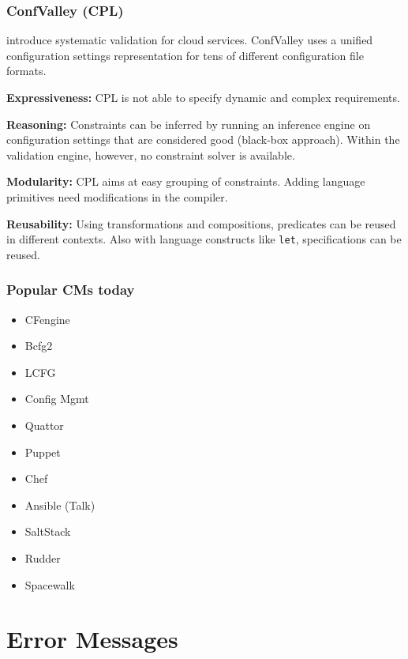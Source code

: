 \begin{frame}
	\frametitle{ConfValley (CPL)}

	\citet{huang2015confvalley} introduce systematic validation for cloud services.
	ConfValley uses a unified configuration settings representation for tens of different configuration file formats.

	\textbf{Expressiveness:}
	CPL is not able to specify dynamic and complex requirements.

	\textbf{Reasoning:}
	Constraints can be inferred by running an inference engine on configuration settings that are considered good (black-box approach).
	Within the validation engine, however, no constraint solver is available.

	\textbf{Modularity:}
	CPL aims at easy grouping of constraints.
	Adding language primitives need modifications in the compiler.

	\textbf{Reusability:}
	Using transformations and compositions, predicates can be reused in different contexts.
	Also with language constructs like \texttt{let}, specifications can be reused.
\end{frame}


\begin{frame}
	\frametitle{Popular CMs today}

	\begin{itemize}[<+-| alert@+>]
	\item CFengine
	\item Bcfg2
	\item LCFG
	\item Config Mgmt
	\item Quattor
	\item Puppet
	\item Chef
	\item Ansible (Talk)
	\item SaltStack
	\item Rudder
	\item Spacewalk
	\end{itemize}
\end{frame}



\section{Error Messages}

\subsection{}

